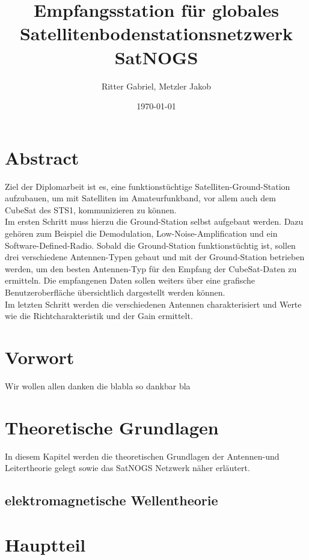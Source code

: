 \documentclass[12pt]{scrreprt}
\title{Empfangsstation für globales Satellitenbodenstationsnetzwerk SatNOGS}
\author{Ritter Gabriel, Metzler Jakob}
\date{\today}
\begin{document}
	
	\maketitle
	
	\chapter{Abstract}
	Ziel der Diplomarbeit ist es, eine funktionstüchtige Satelliten-Ground-Station aufzubauen, um mit 
	Satelliten im Amateurfunkband, vor allem auch dem CubeSat des STS1, kommunizieren zu können.\\
	
	Im ersten Schritt muss hierzu die Ground-Station selbst aufgebaut werden. Dazu gehören zum 
	Beispiel die Demodulation, Low-Noise-Amplification und ein Software-Defined-Radio. Sobald die 
	Ground-Station funktionstüchtig ist, sollen drei verschiedene Antennen-Typen gebaut und mit der 
	Ground-Station betrieben werden, um den besten Antennen-Typ für den Empfang der CubeSat-Daten zu ermitteln. Die empfangenen Daten sollen weiters über eine grafische Benutzeroberfläche 
	übersichtlich dargestellt werden können.\\
	
	
	Im letzten Schritt werden die verschiedenen Antennen charakterisiert und Werte wie die Richtcharakteristik und der Gain ermittelt.
	
	\chapter{Vorwort}
	Wir wollen allen danken die blabla so dankbar bla
	
	\tableofcontents
	\pagebreak
	
	\chapter{Theoretische Grundlagen}
	In diesem Kapitel werden die theoretischen Grundlagen der Antennen-und Leitertheorie gelegt sowie das SatNOGS Netzwerk näher erläutert.
	
	\section{elektromagnetische Wellentheorie}

	\pagebreak
	
	\chapter{Hauptteil}
	\pagebreak
	
\end{document}
